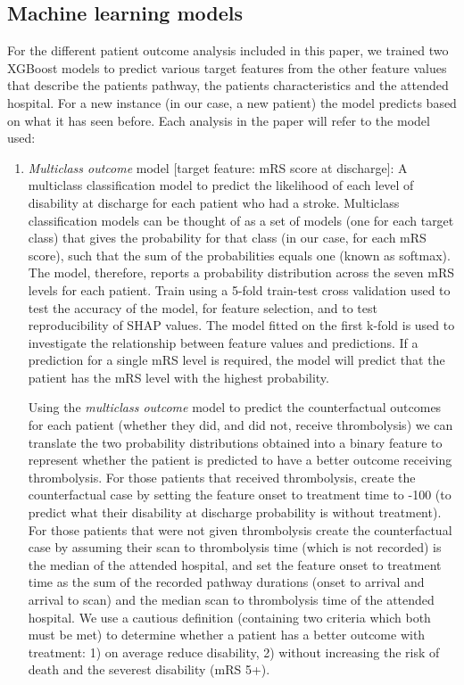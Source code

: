 \subsection{Machine learning models}
For the different patient outcome analysis included in this paper, we trained two XGBoost models to predict various target features from the other feature values that describe the patients pathway, the patients characteristics and the attended hospital. For a new instance (in our case, a new patient) the model predicts based on what it has seen before. Each analysis in the paper will refer to the model used:
\begin{enumerate}
    \item \textit{Multiclass outcome} model [target feature: mRS score at discharge]: A multiclass classification model to predict the likelihood of each level of disability at discharge for each patient who had a stroke. Multiclass classification models can be thought of as a set of models (one for each target class) that gives the probability for that class (in our case, for each mRS score), such that the sum of the probabilities equals one (known as softmax). The model, therefore, reports a probability distribution across the seven mRS levels for each patient. Train using a 5-fold train-test cross validation used to test the accuracy of the model, for feature selection, and to test reproducibility of SHAP values. The model fitted on the first k-fold is used to investigate the relationship between feature values and predictions. If a prediction for a single mRS level is required, the model will predict that the patient has the mRS level with the highest probability.

    Using the \textit{multiclass outcome} model to predict the counterfactual outcomes for each patient (whether they did, and did not, receive thrombolysis) we can translate the two probability distributions obtained into a binary feature to represent whether the patient is predicted to have a better outcome receiving thrombolysis. For those patients that received thrombolysis, create the counterfactual case by setting the feature onset to treatment time to -100 (to predict what their disability at discharge probability is without treatment). For those patients that were not given thrombolysis create the counterfactual case by assuming their scan to thrombolysis time (which is not recorded) is the median of the attended hospital, and set the feature onset to treatment time as the sum of the recorded pathway durations (onset to arrival and arrival to scan) and the median scan to thrombolysis time of the attended hospital. We use a cautious definition (containing two criteria which both must be met) to determine whether a patient has a better outcome with treatment: 1) on average reduce disability, 2) without increasing the risk of death and the severest disability (mRS 5+).
    

\end{enumerate}
